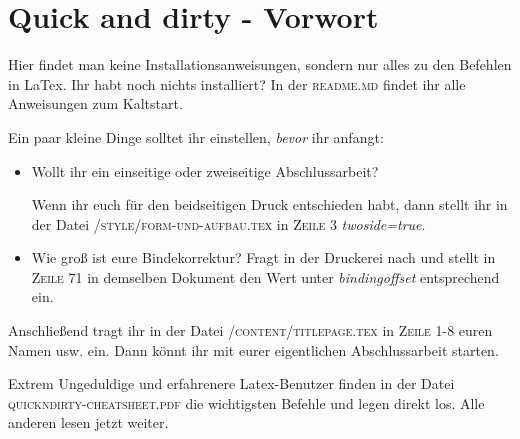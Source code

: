 \chapter{Quick and dirty - Vorwort}%
\label{chap: vorwort}%
Hier findet man keine Installationsanweisungen, sondern nur alles zu den Befehlen in LaTex. Ihr habt noch nichts installiert? In der \textsc{readme.md} findet ihr alle Anweisungen zum Kaltstart.%


Ein paar kleine Dinge solltet ihr einstellen, \emph{bevor} ihr anfangt:%
\begin{itemize}%
\item Wollt ihr ein einseitige oder zweiseitige Abschlussarbeit?%

Wenn ihr euch für den beidseitigen Druck entschieden habt, dann stellt ihr in der Datei \textsc{/style/form-und-aufbau.tex} in \textsc{Zeile 3} \emph{twoside=true}.%
\item Wie groß ist eure Bindekorrektur? Fragt in der Druckerei nach und stellt in \textsc{Zeile 71} in demselben Dokument den Wert unter \emph{bindingoffset} entsprechend ein.%
\end{itemize}%
Anschließend tragt ihr in der Datei \textsc{/content/titlepage.tex} in \textsc{Zeile 1-8} euren Namen usw. ein. Dann könnt ihr mit eurer eigentlichen Abschlussarbeit starten.%

Extrem Ungeduldige und erfahrenere Latex-Benutzer finden in der Datei \textsc{quickndirty-cheatsheet.pdf} die wichtigsten Befehle und legen direkt los. Alle anderen lesen jetzt weiter.%
\newpage